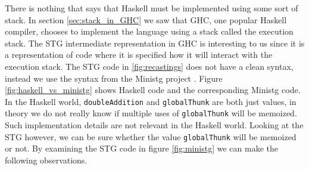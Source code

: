 There is nothing that says that Haskell must be implemented using some
sort of stack. In section \ref{sec:stack_in_GHC} we saw that GHC, one
popular Haskell compiler, chooses to implement the language using a
stack called the execution stack. The STG intermediate representation
in GHC is interesting to us since it is a representation of code where
it is specified how it will interact with the execution stack. The STG
code in \ref{fig:recastings} does not have a clean syntax, instead we
use the syntax from the Ministg project \cite{haskellwiki_ministg}.
Figure \ref{fig:haskell_vs_ministg} shows Haskell code and the
corresponding Ministg code. In the Haskell world, \texttt{doubleAddition} and
\texttt{globalThunk} are both just values, in theory we do not really
know if multiple uses of \texttt{globalThunk} will be memoized. Such
implementation details are not relevant in the Haskell world.
Looking at the STG however, we can be sure whether the value
\texttt{globalThunk} will be memoized or not. By examining the STG code
in figure \ref{fig:ministg} we can make the following observations.

\begin{figure}
\end{figure}

